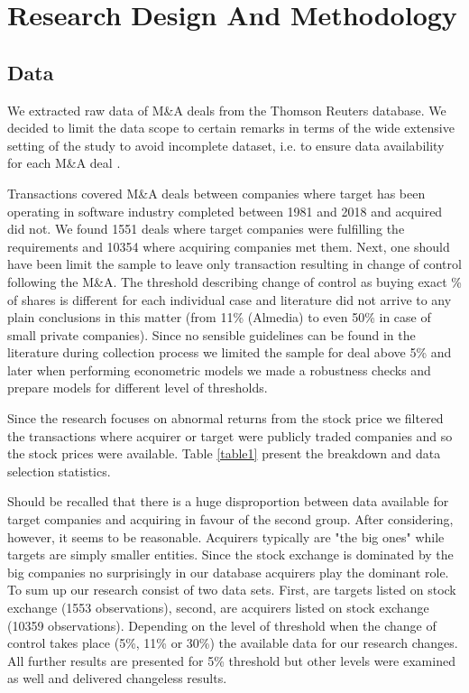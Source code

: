 \section{Research Design And Methodology}\label{Methodology}

\subsection{Data}
We extracted raw data of M\&A deals  from the Thomson Reuters database. We decided to limit the data scope to certain remarks in terms of the wide extensive setting of the study to avoid incomplete dataset, i.e. to ensure data availability for each M\&A deal \cite{mackinlay1997}. 

Transactions covered M\&A deals between companies where target has been operating in software industry completed between 1981 and 2018 and acquired did not. We found 1551 deals where target companies were fulfilling the requirements and 10354 where acquiring companies met them. Next, one should have been limit the sample to leave only transaction resulting in change of control following the M\&A. The threshold describing change of control as buying exact \% of shares is different for each individual case and literature did not arrive to any plain conclusions in this matter (from 11\% (Almedia) to even 50\% in case of small private companies). Since no sensible guidelines can be found in the literature during collection process we limited the sample for deal above 5\% and later when performing econometric models we made a robustness checks and prepare models for different level of thresholds.

Since the research focuses on abnormal returns from the stock price we filtered the transactions where acquirer or target were publicly traded companies and so the stock prices were available. Table  \ref{table1}  present the breakdown and data selection statistics.

Should be recalled that there is a huge disproportion between data available for target companies and acquiring in favour of the second group. After considering, however, it seems to be reasonable. Acquirers typically are "the big ones" while targets are simply smaller entities. Since the stock exchange is dominated by the big companies no surprisingly in our database acquirers play the dominant role. To sum up our research consist of two data sets. First, are targets listed on stock exchange (1553 observations), second, are acquirers listed on stock exchange (10359 observations). Depending on the level of threshold when the change of control takes place (5\%, 11\% or 30\%) the available data for our research changes. All further results are presented for 5\% threshold but other levels were examined as well and delivered changeless results.

